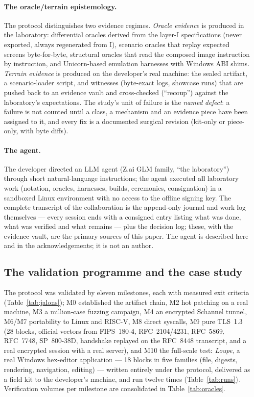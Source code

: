\documentclass[11pt,a4paper]{article}
\begin{document}
\paragraph{The oracle/terrain epistemology.}
The protocol distinguishes two evidence regimes. \emph{Oracle evidence} is
produced in the laboratory: differential oracles derived from the layer-I
specifications (never exported, always regenerated from I), scenario
oracles that replay expected screens byte-for-byte, structural oracles
that read the composed image instruction by instruction, and Unicorn-based
emulation harnesses with Windows ABI shims. \emph{Terrain evidence} is
produced on the developer's real machine: the sealed artifact, a
scenario-loader script, and witnesses (byte-exact logs, showcase runs)
that are pushed back to an evidence vault and cross-checked (``recoup'')
against the laboratory's expectations. The study's unit of failure is the
\emph{named defect}: a failure is not counted until a class, a mechanism
and an evidence piece have been assigned to it, and every fix is a
documented surgical revision (kit-only or piece-only, with byte diffs).

\paragraph{The agent.}
The developer directed an LLM agent (Z.ai GLM family, ``the laboratory'')
through short natural-language instructions; the agent executed all
laboratory work (notation, oracles, harnesses, builds, ceremonies,
consignation) in a sandboxed Linux environment with no access to the
offline signing key. The complete transcript of the collaboration is the
append-only journal and work log themselves --- every session ends with a
consigned entry listing what was done, what was verified and what remains
--- plus the decision log; these, with the evidence vault, are the
primary sources of this paper. The agent is described here and in the
acknowledgements; it is not an author.

\subsection{The validation programme and the case study}\label{sec:cas}

The protocol was validated by eleven milestones, each with measured exit
criteria (Table~\ref{tab:jalons}); M0 established the artifact chain,
M2 hot patching on a real machine, M3 a million-case fuzzing campaign,
M4 an encrypted Schannel tunnel, M6/M7 portability to Linux and RISC-V,
M8 direct syscalls, M9 pure TLS~1.3 (28 blocks, official vectors from
FIPS~180-4, RFC~2104/4231, RFC~5869, RFC~7748, SP~800-38D, handshake
replayed on the RFC~8448 transcript, and a real encrypted session with a
real server), and M10 the full-scale test: \emph{Loupe}, a real Windows
hex-editor application --- 18 blocks in five families (file, digests,
rendering, navigation, editing) --- written entirely under the protocol,
delivered as a field kit to the developer's machine, and run twelve times
(Table~\ref{tab:runs}). Verification volumes per milestone are
consolidated in Table~\ref{tab:oracles}.
\end{document}
